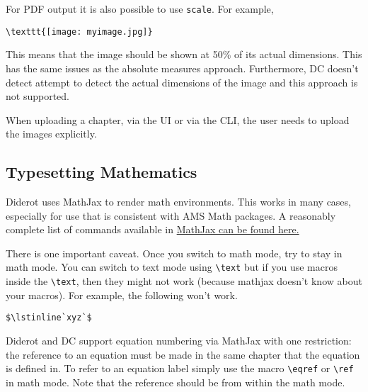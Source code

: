 \begin{important}
For PDF output it is also possible to use \lstinline`scale`.  For example,
\begin{lstlisting}
\texttt{[image: myimage.jpg]}
\end{lstlisting}

This means that the image should be shown at 50\% of its actual dimensions.  This has  the same issues as the absolute measures approach. Furthermore, DC doesn't detect attempt to detect the actual dimensions of the image and this approach is not supported.
\end{important}

\begin{gram}
When uploading a chapter, via the UI or via the CLI, the user needs to upload the images explicitly.   
\end{gram}

\subsection{Typesetting Mathematics}
\label{sec:dc::typesetting-mathematics}

Diderot uses MathJax to render math environments.  This works in many cases, especially for use that is consistent with AMS Math packages.  
%
A reasonably complete list of commands available in 
\href{http://www.onemathematicalcat.org/MathJaxDocumentation/TeXSyntax.htm#alphaList}{MathJax can be found here.}
%

There is one important caveat. 
%
Once you switch to math mode, try to stay in math mode.  You can switch to text mode using \lstinline`\text` but if you use macros inside  the \lstinline`\text`, then they might not work (because mathjax doesn't know about your macros).  For example, the following won't work. 
\begin{lstlisting}
$\lstinline`xyz`$
\end{lstlisting}



Diderot and DC support equation numbering via MathJax with one restriction: the reference to an equation must be made in the same chapter that the equation is defined in.
%
To refer to an equation label simply use the macro \lstinline`\eqref` or \lstinline`\ref` in math mode.  Note that the reference should be from within the math mode.

